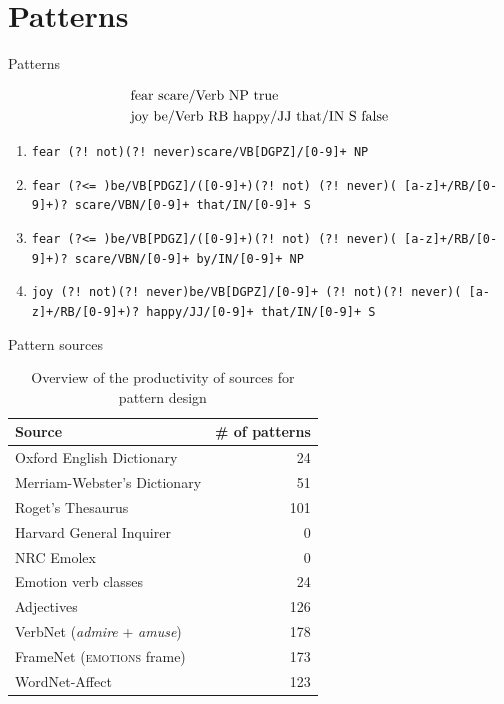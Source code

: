 \documentclass[11pt]{beamer}
\begin{document}
\section{Patterns}

\begin{frame}{Patterns}

\begin{align}
\begin{split}\label{ex:pattern_templates}
&\textnormal{fear	scare/Verb	NP	true}\\
&\textnormal{joy	be/Verb RB happy/JJ that/IN	S	false}
\end{split}
\end{align}

\begin{enumerate}
	\item \texttt{fear	(?! not)(?! never)scare/VB[DGPZ]/[0-9]+
	NP}
	\item \texttt{fear	(?<= )be/VB[PDGZ]/([0-9]+)(?! not)
	(?! never)( [a-z]+/RB/[0-9]+)?
	scare/VBN/[0-9]+ that/IN/[0-9]+	S}
	\item \texttt{fear	(?<= )be/VB[PDGZ]/([0-9]+)(?! not)
	(?! never)( [a-z]+/RB/[0-9]+)?
	scare/VBN/[0-9]+ by/IN/[0-9]+ NP}
	\item \texttt{joy	(?! not)(?! never)be/VB[DGPZ]/[0-9]+
	(?! not)(?! never)( [a-z]+/RB/[0-9]+)?
	happy/JJ/[0-9]+ that/IN/[0-9]+	S}
\end{enumerate}

\end{frame}

\begin{frame}{Pattern sources}
	
\begin{table}[]
\centering
\begin{tabular}{l|r}
{\bf Source}                 & {\bf \# of patterns} \\\hline
Oxford English Dictionary    & 24                   \\
Merriam-Webster's Dictionary & 51                   \\
Roget's Thesaurus            & 101                  \\
Harvard General Inquirer \cite{general_inquirer} & 0 \\
NRC Emolex \cite{nrc_emolex} & 0 \\
Emotion verb classes \cite{emotion_verbs}   & 24                   \\
Adjectives \cite{adjective_supersenses} & 126                  \\
VerbNet (\textit{admire} + \textit{amuse}) \cite{verbnet} & 178                  \\
FrameNet (\textsc{emotions} frame) \cite{framenet}                    & 173                  \\
WordNet-Affect \cite{wordnet-affect}     & 123                 
\end{tabular}
\caption{Overview of the productivity of sources for pattern design}
\label{tab:patterns-from-sources}
\end{table}
\end{frame}
\end{document}
